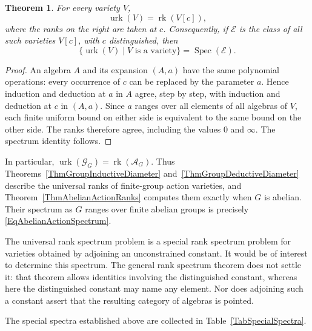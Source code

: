 \documentclass[12pt,english]{amsart}
\newtheorem{theorem}{Theorem}[section]
\theoremstyle{definition}
\numberwithin{equation}{section}
\theoremstyle{remark}
\begin{document}
\begin{theorem}\label{ThmUniversalConstantReduction}
For every variety $V$,
\[
\operatorname{urk}(V)=\operatorname{rk}(V[c]),
\]
where the ranks on the right are taken at $c$.
Consequently, if $\mathscr E$ is the class of all such varieties
$V[c]$, with $c$ distinguished, then
\[
\{\operatorname{urk}(V)\mid V\text{ is a variety}\}
=\operatorname{Spec}(\mathscr E).
\]
\end{theorem}

\begin{proof}
An algebra $A$ and its expansion $(A,a)$ have the same polynomial
operations: every occurrence of $c$ can be replaced by the parameter
$a$. Hence induction and deduction at $a$ in $A$ agree, step by step,
with induction and deduction at $c$ in $(A,a)$. Since $a$ ranges over
all elements of all algebras of $V$, each finite uniform bound on
either side is equivalent to the same bound on the other side.
The ranks therefore agree, including the values $0$ and $\infty$.
The spectrum identity follows.
\end{proof}

In particular, $\operatorname{urk}(\mathcal G_G)
=\operatorname{rk}(\mathcal A_G)$. Thus
Theorems~\ref{ThmGroupInductiveDiameter} and~\ref{ThmGroupDeductiveDiameter}
describe the universal ranks of finite-group action varieties,
and Theorem~\ref{ThmAbelianActionRanks} computes them exactly when
$G$ is abelian. Their spectrum as $G$ ranges over finite abelian
groups is precisely \eqref{EqAbelianActionSpectrum}.

The universal rank spectrum problem is a special rank spectrum
problem for varieties obtained by adjoining an unconstrained constant.
It would be of interest to determine this spectrum. The general rank
spectrum theorem does not settle it: that theorem allows identities
involving the distinguished constant, whereas here the distinguished
constant may name any element. Nor does adjoining such a constant
assert that the resulting category of algebras is pointed.

The special spectra established above are collected in Table~\ref{TabSpecialSpectra}.
\end{document}
